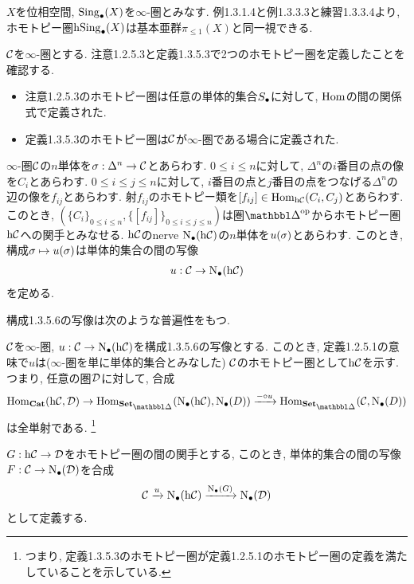 \documentclass[uplatex, a4paper, 14Q, dvipdfmx]{jsreport}
\begin{document}
\begin{example}
  $X$を位相空間, $\Sing_\bullet(X)$を$\infty$-圏とみなす. 
  例1.3.1.4と例1.3.3.3と練習1.3.3.4より, ホモトピー圏$\h \Sing_\bullet(X)$は基本亜群$\pi_{\leq 1}(X)$と同一視できる. 
\end{example}

$\calC$を$\infty$-圏とする. 
注意1.2.5.3と定義1.3.5.3で2つのホモトピー圏を定義したことを確認する. 
\begin{itemize}
  \item 
  注意1.2.5.3のホモトピー圏は任意の単体的集合$\S$に対して, $\Hom$の間の関係式で定義された. 
  \item 
  定義1.3.5.3のホモトピー圏は$\calC$が$\infty$-圏である場合に定義された. 
\end{itemize}

\begin{cons}
  $\infty$-圏$\calC$の$n$単体を$\si: \Delta^n \to \calC$とあらわす. 
  $0 \leq i \leq n$に対して, $\Delta^n$の$i$番目の点の像を$C_i$とあらわす. 
  $0 \leq i \leq j \leq n$に対して, $i$番目の点と$j$番目の点をつなげる$\Delta^n$の辺の像を$f_{ij}$とあらわす. 
  射$f_{ij}$のホモトピー類を$[f_{ij}] \in \Hom_{\h \calC}(C_i,C_j)$とあらわす. 
  このとき, $(\{C_i\}_{0 \leq i \leq n}, \{[f_{ij}]\}_{0 \leq i \leq j \leq n})$は圏$\simop$からホモトピー圏$\h \calC$への関手とみなせる. 
  $\h \calC$のnerve $\N(\h \calC)$の$n$単体を$u(\si)$とあらわす. 
  このとき, 構成$\si \mt u(\si)$は単体的集合の間の写像
  \begin{align*}
    u: \calC \to \N(\h \calC)
  \end{align*}
  を定める. 
\end{cons}

構成1.3.5.6の写像は次のような普遍性をもつ. 

\begin{prop}
  $\calC$を$\infty$-圏, $u: \calC \to \N(\h \calC)$を構成1.3.5.6の写像とする. 
  このとき, 定義1.2.5.1の意味で$u$は($\infty$-圏を単に単体的集合とみなした) $\calC$のホモトピー圏として$\h \calC$を示す. 
  つまり, 任意の圏$\calD$に対して, 合成
  \begin{align*}
    \Hom_{\cat}(\h \calC,\calD) \to \Hom_{\sset}(\N(\h \calC), \N(D)) \xr{- \ci u} \Hom_{\sset}(\calC,\N(D))
  \end{align*}
  は全単射である. 
  \footnote{
    つまり, 定義1.3.5.3のホモトピー圏が定義1.2.5.1のホモトピー圏の定義を満たしていることを示している. 
  }
\end{prop}

\begin{Proof}
  $G: \h\calC \to \calD$をホモトピー圏の間の関手とする, 
  このとき, 単体的集合の間の写像$F: \calC \to \N(\calD)$を合成
  \begin{align*}
    \calC \xr{u} \N(\h\calC) \xr{\N(G)} \N(\calD) 
  \end{align*}
  として定義する. 

\end{Proof}
\end{document}
